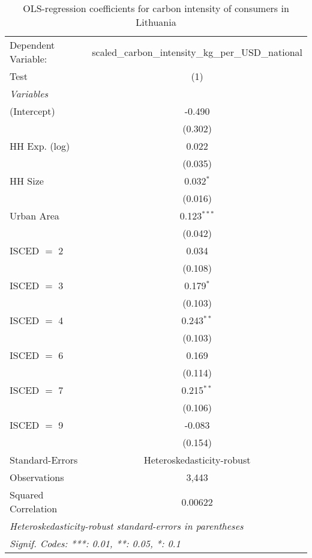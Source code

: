 
\begin{table}[htbp!]
   \centering
   \small
   \begin{adjustbox}{width = 1\textwidth, max height = 0.95\textheight, center}
      \begin{threeparttable}[b]
         \caption{\label{tab:OLS_1_LTU} OLS-regression coefficients for carbon intensity of consumers in Lithuania}
         \begin{tabular}{lc}
            \tabularnewline \midrule \midrule
            Dependent Variable: & scaled\_carbon\_intensity\_kg\_per\_USD\_national\\        
            Test                & (1)\\  
            \midrule
            \emph{Variables}\\
            (Intercept)         & -0.490\\   
                                & (0.302)\\   
            HH Exp. (log)       & 0.022\\   
                                & (0.035)\\   
            HH Size             & 0.032$^{*}$\\   
                                & (0.016)\\   
            Urban Area          & 0.123$^{***}$\\   
                                & (0.042)\\   
            ISCED $=$ 2         & 0.034\\   
                                & (0.108)\\   
            ISCED $=$ 3         & 0.179$^{*}$\\   
                                & (0.103)\\   
            ISCED $=$ 4         & 0.243$^{**}$\\   
                                & (0.103)\\   
            ISCED $=$ 6         & 0.169\\   
                                & (0.114)\\   
            ISCED $=$ 7         & 0.215$^{**}$\\   
                                & (0.106)\\   
            ISCED $=$ 9         & -0.083\\   
                                & (0.154)\\   
            \midrule 
            Standard-Errors     & Heteroskedasticity-robust \\   
            Observations        & 3,443\\  
            Squared Correlation & 0.00622\\  
            \midrule \midrule
            \multicolumn{2}{l}{\emph{Heteroskedasticity-robust standard-errors in parentheses}}\\
            \multicolumn{2}{l}{\emph{Signif. Codes: ***: 0.01, **: 0.05, *: 0.1}}\\
         \end{tabular}
         

\end{threeparttable}
\end{adjustbox}
\end{table}
